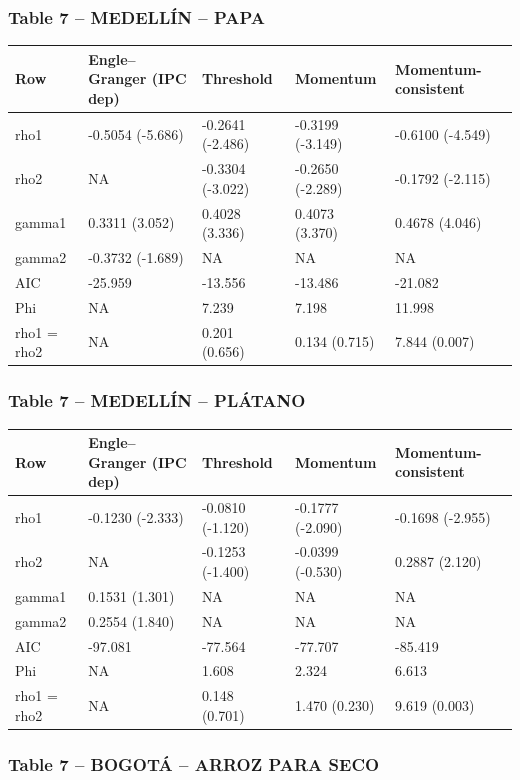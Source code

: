 \documentclass[
  12pt,
]{article}
\begin{document}
\subsubsection{Table 7 -- MEDELLÍN --
PAPA}\label{table-7-medelluxedn-papa}

\begin{longtable}[t]{lllll}
\toprule
Row & Engle–Granger (IPC dep) & Threshold & Momentum & Momentum-consistent\\
\midrule
rho1 & -0.5054 (-5.686) & -0.2641 (-2.486) & -0.3199 (-3.149) & -0.6100 (-4.549)\\
rho2 & NA & -0.3304 (-3.022) & -0.2650 (-2.289) & -0.1792 (-2.115)\\
gamma1 & 0.3311 (3.052) & 0.4028 (3.336) & 0.4073 (3.370) & 0.4678 (4.046)\\
gamma2 & -0.3732 (-1.689) & NA & NA & NA\\
AIC & -25.959 & -13.556 & -13.486 & -21.082\\
\addlinespace
Phi & NA & 7.239 & 7.198 & 11.998\\
rho1 = rho2 & NA & 0.201 (0.656) & 0.134 (0.715) & 7.844 (0.007)\\
\bottomrule
\end{longtable}

\subsubsection{Table 7 -- MEDELLÍN --
PLÁTANO}\label{table-7-medelluxedn-pluxe1tano}

\begin{longtable}[t]{lllll}
\toprule
Row & Engle–Granger (IPC dep) & Threshold & Momentum & Momentum-consistent\\
\midrule
rho1 & -0.1230 (-2.333) & -0.0810 (-1.120) & -0.1777 (-2.090) & -0.1698 (-2.955)\\
rho2 & NA & -0.1253 (-1.400) & -0.0399 (-0.530) & 0.2887 (2.120)\\
gamma1 & 0.1531 (1.301) & NA & NA & NA\\
gamma2 & 0.2554 (1.840) & NA & NA & NA\\
AIC & -97.081 & -77.564 & -77.707 & -85.419\\
\addlinespace
Phi & NA & 1.608 & 2.324 & 6.613\\
rho1 = rho2 & NA & 0.148 (0.701) & 1.470 (0.230) & 9.619 (0.003)\\
\bottomrule
\end{longtable}

\subsubsection{Table 7 -- BOGOTÁ -- ARROZ PARA
SECO}\label{table-7-bogotuxe1-arroz-para-seco}
\end{document}
